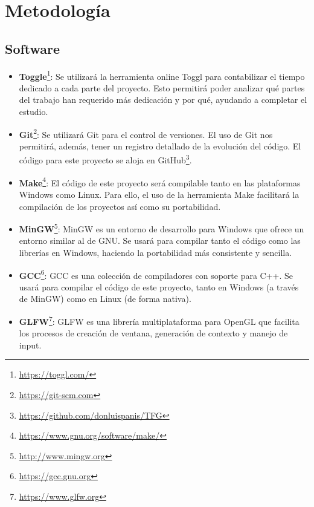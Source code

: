 
\chapter{Metodología}

\section{Software}

\begin{itemize}
	\item \textbf{Toggle}\footnote{\url{https://toggl.com/}}: Se utilizará la herramienta online Toggl para contabilizar el tiempo dedicado a cada parte del proyecto. Esto permitirá poder analizar qué partes del trabajo han requerido más dedicación y por qué, ayudando a completar el estudio.
	\item \textbf{Git}\footnote{\url{https://git-scm.com}}: Se utilizará Git para el control de versiones. El uso de Git nos permitirá, además, tener un registro detallado de la evolución del código. El código para este proyecto se aloja en GitHub\footnote{\url{https://github.com/donluispanis/TFG}}.
	\item \textbf{Make}\footnote{\url{https://www.gnu.org/software/make/}}: El código de este proyecto será compilable tanto en las plataformas Windows como Linux. Para ello, el uso de la herramienta Make facilitará la compilación de los proyectos así como su portabilidad.
	\item \textbf{MinGW}\footnote{\url{http://www.mingw.org}}: MinGW es un entorno de desarrollo para Windows que ofrece un entorno similar al de GNU. Se usará para compilar tanto el código como las librerías en Windows, haciendo la portabilidad más consistente y sencilla.
	\item \textbf{GCC}\footnote{\url{https://gcc.gnu.org}}: GCC es una colección de compiladores con soporte para C++. Se usará para compilar el código de este proyecto, tanto en Windows (a través de MinGW) como en Linux (de forma nativa).
	\item \textbf{GLFW}\footnote{\url{https://www.glfw.org}}: GLFW es una librería multiplataforma para OpenGL que facilita los procesos de creación de ventana, generación de contexto y manejo de input. 

\end{itemize}
